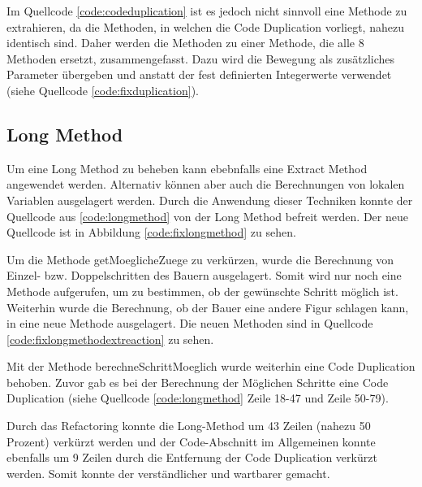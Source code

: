 Im Quellcode \ref{code:codeduplication} ist es jedoch nicht sinnvoll eine Methode zu extrahieren, da die Methoden, in welchen die Code Duplication vorliegt, nahezu identisch sind. Daher werden die Methoden zu einer Methode, die alle 8 Methoden ersetzt, zusammengefasst. Dazu wird die Bewegung als zusätzliches Parameter übergeben und anstatt der fest definierten Integerwerte verwendet (siehe Quellcode \ref{code:fixduplication}). 




\subsection{Long Method}
Um eine Long Method zu beheben kann ebebnfalls eine Extract Method angewendet werden. Alternativ können aber auch die Berechnungen von lokalen Variablen ausgelagert werden. Durch die Anwendung dieser Techniken konnte der Quellcode aus \ref{code:longmethod} von der Long Method befreit werden. Der neue Quellcode ist in Abbildung \ref{code:fixlongmethod} zu sehen.



Um die Methode getMoeglicheZuege zu verkürzen, wurde die Berechnung von Einzel- bzw. Doppelschritten des Bauern ausgelagert. Somit wird nur noch eine Methode aufgerufen, um zu bestimmen, ob der gewünschte Schritt möglich ist. Weiterhin wurde die Berechnung, ob der Bauer eine andere Figur schlagen kann, in eine neue Methode ausgelagert. Die neuen Methoden sind in Quellcode \ref{code:fixlongmethodextreaction} zu sehen. 




Mit der Methode berechneSchrittMoeglich wurde weiterhin eine Code Duplication behoben. Zuvor gab es bei der Berechnung der Möglichen Schritte eine Code Duplication (siehe Quellcode \ref{code:longmethod} Zeile 18-47 und Zeile 50-79).

Durch das Refactoring konnte die Long-Method um 43 Zeilen (nahezu 50 Prozent) verkürzt werden und der Code-Abschnitt im Allgemeinen konnte ebenfalls um 9 Zeilen durch die Entfernung der Code Duplication verkürzt werden. Somit konnte der verständlicher und wartbarer gemacht.

